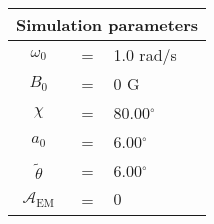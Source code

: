 \begin{tabular}{ccl}
\multicolumn{3}{c}{Simulation parameters} \\
\hline
$\omega_0$  &=& 1.0 rad/s\\
$B_0$  &=& $0$ G \\
$\chi$  &=& 80.00$^{\circ}$ \\
$a_0$ &=& 6.00$^{\circ}$ \\
$\tilde{\theta}$ &= & 6.00$^{\circ}$ \\
$\mathcal{A}_{\mathrm{EM}}$ &= & $0$
\end{tabular}
